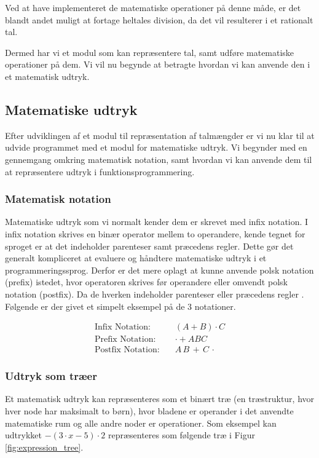 Ved at have implementeret de matematiske operationer på denne måde, er det blandt andet muligt at fortage heltales division, da det vil resulterer i et rationalt tal.

Dermed har vi et modul som kan repræsentere tal, samt udføre matematiske operationer på dem. Vi vil nu begynde at betragte hvordan vi kan anvende den i et matematisk udtryk.

\subsection{Matematiske udtryk}
Efter udviklingen af et modul til repræsentation af talmængder er vi nu klar til at udvide programmet med et modul for matematiske udtryk. Vi begynder med en gennemgang omkring matematisk notation, samt hvordan vi kan anvende dem til at repræsentere udtryk i funktionsprogrammering. 

\subsubsection{Matematisk notation}
Matematiske udtryk som vi normalt kender dem er skrevet med infix notation. I infix notation skrives en binær operator mellem to operandere, kende tegnet for sproget er at det indeholder parenteser samt præcedens regler. Dette gør det generalt kompliceret at evaluere og håndtere matematiske udtryk i et programmeringssprog. Derfor er det mere oplagt at kunne anvende polsk notation (prefix) istedet, hvor operatoren skrives før operandere eller omvendt polsk notation (postfix). Da de hverken indeholder parenteser eller præcedens regler . Følgende er der givet et simpelt eksempel på de 3 notationer. 

\begin{align*}
    \text{Infix Notation:} \quad & (A + B) \cdot C \\
    \text{Prefix Notation:} \quad &  \cdot + A B C  \\
    \text{Postfix Notation:} \quad & A \, B \, + \, C \, \cdot
\end{align*}

 

\subsubsection{Udtryk som træer} \label{sec:expression_as_trees}
Et matematisk udtryk kan repræsenteres som et binært træ (en træstruktur, hvor hver node har maksimalt to børn), hvor bladene er operander i det anvendte matematiske rum og alle andre noder er operationer. Som eksempel kan udtrykket $-(3 \cdot x - 5) \cdot 2$ repræsenteres som følgende træ i Figur \ref{fig:expression_tree}. 


